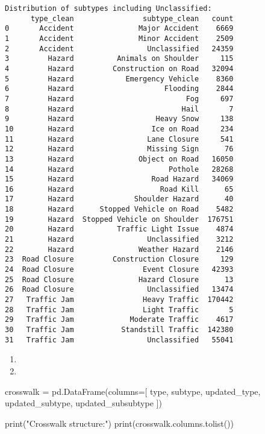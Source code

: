 \documentclass[
  letterpaper,
  DIV=11,
  numbers=noendperiod]{scrartcl}
\newenvironment{Shaded}{\begin{snugshade}}{\end{snugshade}}
\newcommand{\BuiltInTok}[1]{\textcolor[rgb]{0.00,0.23,0.31}{#1}}
\newcommand{\NormalTok}[1]{\textcolor[rgb]{0.00,0.23,0.31}{#1}}
\newcommand{\OperatorTok}[1]{\textcolor[rgb]{0.37,0.37,0.37}{#1}}
\newcommand{\StringTok}[1]{\textcolor[rgb]{0.13,0.47,0.30}{#1}}
\providecommand{\tightlist}{%
  \setlength{\itemsep}{0pt}\setlength{\parskip}{0pt}}\usepackage{longtable,booktabs,array}
\begin{document}
\begin{verbatim}
Distribution of subtypes including Unclassified:
      type_clean                subtype_clean   count
0       Accident               Major Accident    6669
1       Accident               Minor Accident    2509
2       Accident                 Unclassified   24359
3         Hazard          Animals on Shoulder     115
4         Hazard         Construction on Road   32094
5         Hazard            Emergency Vehicle    8360
6         Hazard                     Flooding    2844
7         Hazard                          Fog     697
8         Hazard                         Hail       7
9         Hazard                   Heavy Snow     138
10        Hazard                  Ice on Road     234
11        Hazard                 Lane Closure     541
12        Hazard                 Missing Sign      76
13        Hazard               Object on Road   16050
14        Hazard                      Pothole   28268
15        Hazard                  Road Hazard   34069
16        Hazard                    Road Kill      65
17        Hazard              Shoulder Hazard      40
18        Hazard      Stopped Vehicle on Road    5482
19        Hazard  Stopped Vehicle on Shoulder  176751
20        Hazard          Traffic Light Issue    4874
21        Hazard                 Unclassified    3212
22        Hazard               Weather Hazard    2146
23  Road Closure         Construction Closure     129
24  Road Closure                Event Closure   42393
25  Road Closure               Hazard Closure      13
26  Road Closure                 Unclassified   13474
27   Traffic Jam                Heavy Traffic  170442
28   Traffic Jam                Light Traffic       5
29   Traffic Jam             Moderate Traffic    4617
30   Traffic Jam           Standstill Traffic  142380
31   Traffic Jam                 Unclassified   55041
\end{verbatim}

\begin{enumerate}
\def\labelenumi{\arabic{enumi}.}
\setcounter{enumi}{3}
\tightlist
\item
\item
\end{enumerate}

\begin{Shaded}
\begin{Highlighting}[]
\NormalTok{crosswalk }\OperatorTok{=}\NormalTok{ pd.DataFrame(columns}\OperatorTok{=}\NormalTok{[}
    \StringTok{\textquotesingle{}type\textquotesingle{}}\NormalTok{,             }
    \StringTok{\textquotesingle{}subtype\textquotesingle{}}\NormalTok{,           }
    \StringTok{\textquotesingle{}updated\_type\textquotesingle{}}\NormalTok{,      }
    \StringTok{\textquotesingle{}updated\_subtype\textquotesingle{}}\NormalTok{,   }
    \StringTok{\textquotesingle{}updated\_subsubtype\textquotesingle{}} 
\NormalTok{])}

\BuiltInTok{print}\NormalTok{(}\StringTok{"Crosswalk structure:"}\NormalTok{)}
\BuiltInTok{print}\NormalTok{(crosswalk.columns.tolist())}
\end{Highlighting}
\end{Shaded}
\end{document}
